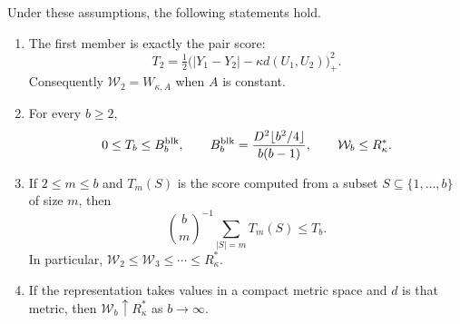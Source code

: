 \begin{theorem}
\label{thm:block-hierarchy}
Under these assumptions, the following statements hold.
\begin{enumerate}[label=(\roman*),leftmargin=*,itemsep=2pt]
\item The first member is exactly the pair score:
\[
 T_2=\tfrac12\bigl(|Y_1-Y_2|-\kappa d(U_1,U_2)\bigr)_+^2.
\]
Consequently $\mathcal{W}_2=W_{\kappa,A}$ when $A$ is constant.
\item For every $b\geq2$,
\begin{equation}
 0\leq T_b\leq B_b^{\rm blk},
 \qquad B_b^{\rm blk}=\frac{D^2\lfloor b^2/4\rfloor}{b(b-1)},
 \qquad \mathcal{W}_b\leq R^*_\kappa.
 \label{eq:block-range}
\end{equation}
\item If $2\leq m\leq b$ and $T_m(S)$ is the score computed from a
subset $S\subseteq\{1,\ldots,b\}$ of size $m$, then
\begin{equation}
 \binom bm^{-1}\sum_{|S|=m}T_m(S)\leq T_b.
 \label{eq:block-subset}
\end{equation}
In particular,
$\mathcal{W}_2\leq \mathcal{W}_3\leq\cdots\leq R^*_\kappa$.
\item If the representation takes values in a compact metric space
and $d$ is that metric, then $\mathcal{W}_b\uparrow R^*_\kappa$ as
$b\to\infty$.
\end{enumerate}
\end{theorem}

